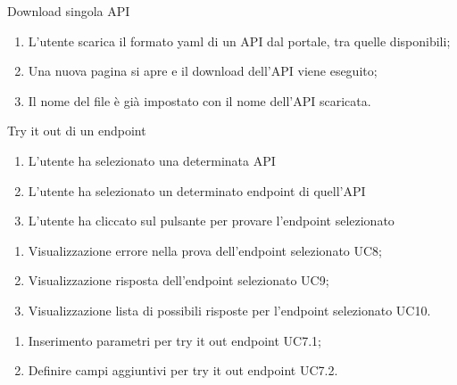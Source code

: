 \begin{usecase}{6}{Download singola API}\label{uc:download-singola-api}

    \usecasemain{}
        \begin{enumerate}
            \item L'utente scarica il formato yaml di un API dal portale, tra quelle disponibili;
            \item Una nuova pagina si apre e il download dell'API viene eseguito;
            \item Il nome del file è già impostato con il nome dell'API scaricata.
        \end{enumerate}

\end{usecase}


\begin{usecase}{7}{Try it out di un endpoint}\label{uc:try-it-out-di-un-endpoint}

    \usecasemain{}
        \begin{enumerate}
            \item L'utente ha selezionato una determinata API
            \item L'utente ha selezionato un determinato endpoint di quell'API
            \item L'utente ha cliccato sul pulsante per provare l'endpoint selezionato
        \end{enumerate}

    \usecaseext{}
        \begin{enumerate}
            \item Visualizzazione errore nella prova dell'endpoint selezionato UC8;
            \item Visualizzazione risposta dell'endpoint selezionato UC9;
            \item Visualizzazione lista di possibili risposte per l'endpoint selezionato UC10.
        \end{enumerate}

    \usecasegen{}
        \begin{enumerate}
            \item Inserimento parametri per try it out endpoint UC7.1;
            \item Definire campi aggiuntivi per try it out endpoint UC7.2.
        \end{enumerate}

\end{usecase}


